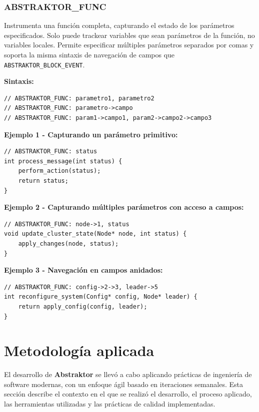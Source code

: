 \documentclass[12pt]{article}
\begin{document}
\subsubsection{ABSTRAKTOR\_FUNC}

Instrumenta una función completa, capturando el estado de los parámetros especificados. Solo puede trackear variables que sean parámetros de la función, no variables locales. Permite especificar múltiples parámetros separados por comas y soporta la misma sintaxis de navegación de campos que \texttt{ABSTRAKTOR\_BLOCK\_EVENT}.

\textbf{Sintaxis:}
\begin{verbatim}
// ABSTRAKTOR_FUNC: parametro1, parametro2
// ABSTRAKTOR_FUNC: parametro->campo
// ABSTRAKTOR_FUNC: param1->campo1, param2->campo2->campo3
\end{verbatim}

\textbf{Ejemplo 1 - Capturando un parámetro primitivo:}

\begin{verbatim}
// ABSTRAKTOR_FUNC: status
int process_message(int status) {
    perform_action(status);
    return status;
}
\end{verbatim}

\textbf{Ejemplo 2 - Capturando múltiples parámetros con acceso a campos:}

\begin{verbatim}
// ABSTRAKTOR_FUNC: node->1, status
void update_cluster_state(Node* node, int status) {
    apply_changes(node, status);
}
\end{verbatim}

\textbf{Ejemplo 3 - Navegación en campos anidados:}

\begin{verbatim}
// ABSTRAKTOR_FUNC: config->2->3, leader->5
int reconfigure_system(Config* config, Node* leader) {
    return apply_config(config, leader);
}
\end{verbatim}


\section{Metodología aplicada}

El desarrollo de \textbf{Abstraktor} se llevó a cabo aplicando prácticas de ingeniería de software modernas, con un enfoque ágil basado en iteraciones semanales. Esta sección describe el contexto en el que se realizó el desarrollo, el proceso aplicado, las herramientas utilizadas y las prácticas de calidad implementadas.
\end{document}

